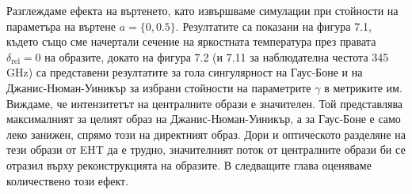Разглеждаме ефекта на въртенето, като извършваме симулации при стойности на параметъра на въртене $a = \{0, 0.5\}$. Резултатите са показани на фигура 7.1, където също сме начертали сечение на яркостната температура през правата $\delta_{\text{rel}} = 0$ на образите, докато на фигура 7.2 (и 7.11 за наблюдателна честота 345 GHz) са представени резултатите за гола сингулярност на Гаус-Боне и на Джанис-Нюман-Уиникър за избрани стойности на параметрите $\gamma$ в метриките им.\\

\noindent Виждаме, че интензитетът на централните образи е значителен. Той представлява максималният за целият образ на Джанис-Нюман-Уиникър, а за Гаус-Боне е само леко занижен, спрямо този на директният образ. Дори и оптическото разделяне на тези образи от EHT да е трудно, значителният поток от централните образи би се отразил върху реконструкцията на образите. В следващите глава оценяваме количествено този ефект.
\newpage

